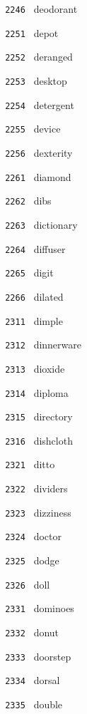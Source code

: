 \documentclass[11pt]{article}
\begin{document}
\begin{multicols}{6}
\noindent \texttt{ 2246 } deodorant  \par
\vspace{3mm}
\noindent \texttt{ 2251 } depot  \par
\noindent \texttt{ 2252 } deranged  \par
\noindent \texttt{ 2253 } desktop  \par
\noindent \texttt{ 2254 } detergent  \par
\noindent \texttt{ 2255 } device  \par
\noindent \texttt{ 2256 } dexterity  \par
\vspace{3mm}
\noindent \texttt{ 2261 } diamond  \par
\noindent \texttt{ 2262 } dibs  \par
\noindent \texttt{ 2263 } dictionary  \par
\noindent \texttt{ 2264 } diffuser  \par
\noindent \texttt{ 2265 } digit  \par
\noindent \texttt{ 2266 } dilated  \par
\noindent \texttt{ 2311 } dimple  \par
\noindent \texttt{ 2312 } dinnerware  \par
\noindent \texttt{ 2313 } dioxide  \par
\noindent \texttt{ 2314 } diploma  \par
\noindent \texttt{ 2315 } directory  \par
\noindent \texttt{ 2316 } dishcloth  \par
\vspace{3mm}
\noindent \texttt{ 2321 } ditto  \par
\noindent \texttt{ 2322 } dividers  \par
\noindent \texttt{ 2323 } dizziness  \par
\noindent \texttt{ 2324 } doctor  \par
\noindent \texttt{ 2325 } dodge  \par
\noindent \texttt{ 2326 } doll  \par
\vspace{3mm}
\noindent \texttt{ 2331 } dominoes  \par
\noindent \texttt{ 2332 } donut  \par
\noindent \texttt{ 2333 } doorstep  \par
\noindent \texttt{ 2334 } dorsal  \par
\noindent \texttt{ 2335 } double  \par

\end{multicols}
\end{document}
